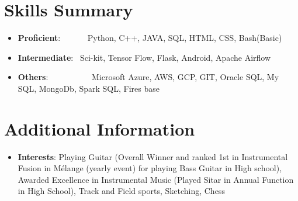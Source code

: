 \documentclass[a4paper,20pt]{article}
\newcommand{\resumeItem}[2]{
  \item\small{
    \textbf{#1}{: #2 \vspace{-2pt}}
  }
}
\newcommand{\resumeSubItem}[2]{\resumeItem{#1}{#2}\vspace{-3pt}}
\newcommand{\resumeSubHeadingListStart}{\begin{itemize}[leftmargin=*]}
\newcommand{\resumeSubHeadingListEnd}{\end{itemize}}
\begin{document}
\section{Skills Summary}
	\resumeSubHeadingListStart
	\resumeSubItem{Proficient}{~~~~~~Python, C++, JAVA, SQL, HTML, CSS, Bash(Basic)}
	\resumeSubItem{Intermediate}{~Sci-kit, Tensor Flow, Flask, Android, Apache Airflow}
	\resumeSubItem{Others}{~~~~~~~~~~Microsoft Azure, AWS, GCP, GIT, Oracle SQL, My SQL, MongoDb, Spark SQL, Fires base}
	\resumeSubHeadingListEnd
\vspace{-5pt}
\section{Additional Information}
	\resumeSubHeadingListStart
    \resumeSubItem{Interests} {Playing Guitar (Overall Winner and ranked 1st in Instrumental Fusion in Mélange (yearly event) for playing Bass Guitar in High school), Awarded Excellence in Instrumental Music (Played Sitar in Annual Function in High School), Track and Field sports, Sketching, Chess}
    \resumeSubHeadingListEnd
\end{document}
